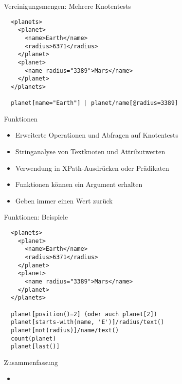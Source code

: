 \documentclass{beamer}
\begin{document}
\begin{frame}[fragile]{Vereinigungsmengen: Mehrere Knotentests}
	
	\lstset{language=XML}
	\begin{lstlisting}
  <planets>
    <planet>
      <name>Earth</name>
      <radius>6371</radius>
    </planet>
    <planet>
      <name radius="3389">Mars</name>
    </planet>
  </planets>
	
  planet[name="Earth"] | planet/name[@radius=3389]
	\end{lstlisting}
	
\end{frame}

\begin{frame}{Funktionen}
	
	\begin{itemize}
		\item Erweiterte Operationen und Abfragen auf Knotentests
		\item Stringanalyse von Textknoten und Attributwerten
		\item Verwendung in XPath-Ausdrücken oder Prädikaten
		\item Funktionen können ein Argument erhalten
		\item Geben immer einen Wert zurück
	\end{itemize}
	
\end{frame}

\begin{frame}[fragile]{Funktionen: Beispiele}
	
	\lstset{language=XML}
	\begin{lstlisting}
  <planets>
    <planet>
      <name>Earth</name>
      <radius>6371</radius>
    </planet>
    <planet>
      <name radius="3389">Mars</name>
    </planet>
  </planets>
	
  planet[position()=2] (oder auch planet[2])
  planet[starts-with(name, 'E')]/radius/text()
  planet[not(radius)]/name/text()
  count(planet)
  planet[last()]
	\end{lstlisting}
	
\end{frame}

\begin{frame}{Zusammenfassung}
	
	\begin{itemize}
		\item
	\end{itemize}
	
\end{frame}
\end{document}
